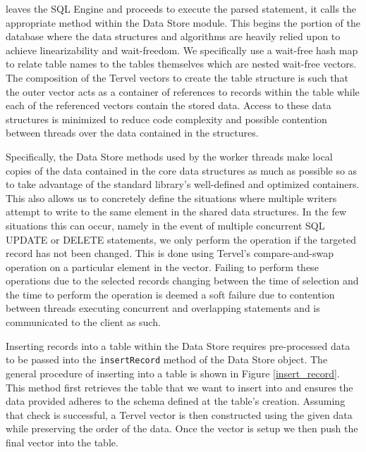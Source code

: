 \documentclass[letter,11pt]{article}
\newcommand{\inlinecode}[1]{\colorbox{codegrey}{\lstinline[language=C++]{#1}}}
\begin{document}
leaves the SQL Engine and proceeds to execute the parsed statement, it calls the appropriate
method within the Data Store module. This begins the portion of the database where the data 
structures and algorithms are heavily relied upon to achieve linearizability and wait-freedom.
We specifically use a wait-free hash map to relate table names to the tables themselves which are nested
wait-free vectors. The composition of the Tervel vectors to create the table structure is such that the outer
vector acts as a container of references to records within the table while each of the referenced vectors
contain the stored data. Access to these data structures is minimized to reduce code complexity and 
possible contention between threads over the data contained in the structures.
\par\vspace{\baselineskip}
Specifically, the Data Store methods used by the worker threads make local copies of the data contained
in the core data structures as much as possible so as to take advantage of the standard library's
well-defined and optimized containers. This also allows us to concretely define the situations where 
multiple writers attempt to write to the same element in the shared data structures. In the few situations
this can occur, namely in the event of multiple concurrent SQL UPDATE or DELETE statements, we only perform
the operation if the targeted record has not been changed. This is done using Tervel's compare-and-swap 
operation on a particular element in the vector. Failing to perform these operations due to the 
selected records changing between the time of selection and the time to perform the operation
is deemed a soft failure due to contention between threads executing concurrent and overlapping statements
and is communicated to the client as such.
\par\vspace{\baselineskip}
Inserting records into a table within the Data Store requires pre-processed data to be passed
into the \inlinecode{insertRecord} method of the Data Store object. The general procedure of inserting
into a table is shown in Figure \ref{insert_record}. This method first retrieves the table 
that we want to insert into and ensures the data provided adheres to the schema defined 
at the table's creation. Assuming that check is successful, a Tervel vector is then 
constructed using the given data while preserving the order of the data. Once the vector 
is setup we then push the final vector into the table.
\end{document}
